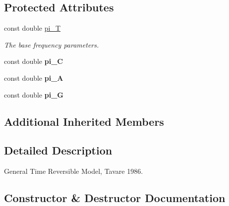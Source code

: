 \subsection*{Protected Attributes}
\textbf{ }\par
\begin{DoxyCompactItemize}
\item 
const double \mbox{\hyperlink{classrcombinator_1_1GTRModel_a1f58fe556a5ce9aaba6168c9f91e8372}{pi\+\_\+T}}
\begin{DoxyCompactList}\small\item\em The base frequency parameters. \end{DoxyCompactList}\item 
\mbox{\label{classrcombinator_1_1GTRModel_ac601c64807a386c360ecfa78ba2dba18}} 
const double {\bfseries pi\+\_\+C}
\item 
\mbox{\label{classrcombinator_1_1GTRModel_a8cb703f73d2ee28f85ceaa3459bba8a6}} 
const double {\bfseries pi\+\_\+A}
\item 
\mbox{\label{classrcombinator_1_1GTRModel_a249c03ce37700cf0f7374a06e96b2f9e}} 
const double {\bfseries pi\+\_\+G}
\end{DoxyCompactItemize}

\subsection*{Additional Inherited Members}


\subsection{Detailed Description}
General Time Reversible Model, Tavare 1986. 

\subsection{Constructor \& Destructor Documentation}
\mbox{\label{classrcombinator_1_1GTRModel_addd67a44caae9a477fc986d287dc2e8e}} 
